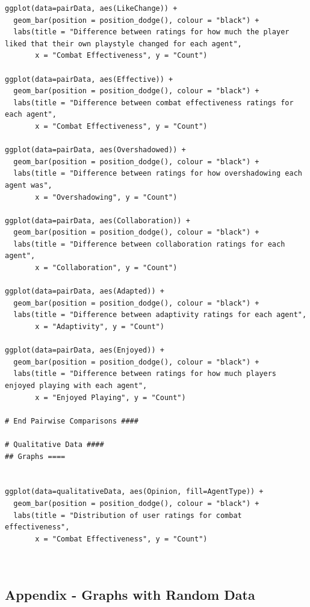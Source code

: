 \documentclass{IEEEtran}
\begin{document}
\begin{verbatim}
ggplot(data=pairData, aes(LikeChange)) +
  geom_bar(position = position_dodge(), colour = "black") +
  labs(title = "Difference between ratings for how much the player liked that their own playstyle changed for each agent",
       x = "Combat Effectiveness", y = "Count")

ggplot(data=pairData, aes(Effective)) +
  geom_bar(position = position_dodge(), colour = "black") +
  labs(title = "Difference between combat effectiveness ratings for each agent",
       x = "Combat Effectiveness", y = "Count")

ggplot(data=pairData, aes(Overshadowed)) +
  geom_bar(position = position_dodge(), colour = "black") +
  labs(title = "Difference between ratings for how overshadowing each agent was",
       x = "Overshadowing", y = "Count")

ggplot(data=pairData, aes(Collaboration)) +
  geom_bar(position = position_dodge(), colour = "black") +
  labs(title = "Difference between collaboration ratings for each agent",
       x = "Collaboration", y = "Count")

ggplot(data=pairData, aes(Adapted)) +
  geom_bar(position = position_dodge(), colour = "black") +
  labs(title = "Difference between adaptivity ratings for each agent",
       x = "Adaptivity", y = "Count")

ggplot(data=pairData, aes(Enjoyed)) +
  geom_bar(position = position_dodge(), colour = "black") +
  labs(title = "Difference between ratings for how much players enjoyed playing with each agent",
       x = "Enjoyed Playing", y = "Count")

# End Pairwise Comparisons ####

# Qualitative Data ####
## Graphs ====


ggplot(data=qualitativeData, aes(Opinion, fill=AgentType)) +
  geom_bar(position = position_dodge(), colour = "black") +
  labs(title = "Distribution of user ratings for combat effectiveness",
       x = "Combat Effectiveness", y = "Count")



\end{verbatim}

\newpage

\subsection{Appendix - Graphs with Random Data}

\end{document}
